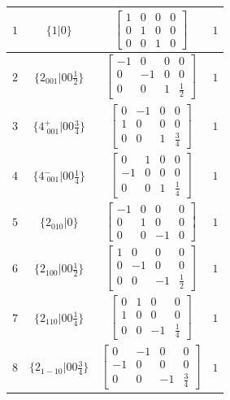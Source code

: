 \documentclass[fleqn,8pt]{jsarticle}
\begin{document}
\begin{longtable}{cccc}
$ 1 $ & $ \{1|0\} $ & $ \begin{bmatrix} 1 & 0 & 0 & 0 \\ 0 & 1 & 0 & 0 \\ 0 & 0 & 1 & 0 \end{bmatrix} $ & $ 1 $ \\ \hline
$ 2 $ & $ \{2{}_{001}|0 0 \frac{1}{2}\} $ & $ \begin{bmatrix} -1 & 0 & 0 & 0 \\ 0 & -1 & 0 & 0 \\ 0 & 0 & 1 & \frac{1}{2} \end{bmatrix} $ & $ 1 $ \\ \hline
$ 3 $ & $ \{4^{+}_{\,\,001}|0 0 \frac{3}{4}\} $ & $ \begin{bmatrix} 0 & -1 & 0 & 0 \\ 1 & 0 & 0 & 0 \\ 0 & 0 & 1 & \frac{3}{4} \end{bmatrix} $ & $ 1 $ \\ \hline
$ 4 $ & $ \{4^{-}_{\,\,001}|0 0 \frac{1}{4}\} $ & $ \begin{bmatrix} 0 & 1 & 0 & 0 \\ -1 & 0 & 0 & 0 \\ 0 & 0 & 1 & \frac{1}{4} \end{bmatrix} $ & $ 1 $ \\ \hline
$ 5 $ & $ \{2{}_{010}|0\} $ & $ \begin{bmatrix} -1 & 0 & 0 & 0 \\ 0 & 1 & 0 & 0 \\ 0 & 0 & -1 & 0 \end{bmatrix} $ & $ 1 $ \\ \hline
$ 6 $ & $ \{2{}_{100}|0 0 \frac{1}{2}\} $ & $ \begin{bmatrix} 1 & 0 & 0 & 0 \\ 0 & -1 & 0 & 0 \\ 0 & 0 & -1 & \frac{1}{2} \end{bmatrix} $ & $ 1 $ \\ \hline
$ 7 $ & $ \{2{}_{110}|0 0 \frac{1}{4}\} $ & $ \begin{bmatrix} 0 & 1 & 0 & 0 \\ 1 & 0 & 0 & 0 \\ 0 & 0 & -1 & \frac{1}{4} \end{bmatrix} $ & $ 1 $ \\ \hline
$ 8 $ & $ \{2{}_{1-10}|0 0 \frac{3}{4}\} $ & $ \begin{bmatrix} 0 & -1 & 0 & 0 \\ -1 & 0 & 0 & 0 \\ 0 & 0 & -1 & \frac{3}{4} \end{bmatrix} $ & $ 1 $ \\
\end{longtable}
\end{document}
